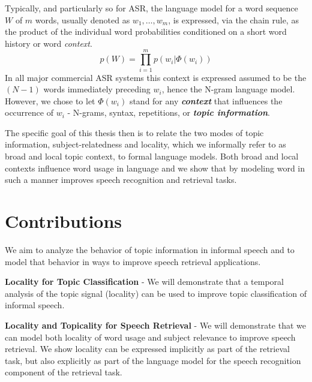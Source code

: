 Typically, and particularly so for ASR, the language model for a word sequence $W$ of $m$ words, usually denoted as $w_1,\ldots,w_m$, is expressed, via the chain rule, as the product of the individual word probabilities conditioned on a short word history or word \textit{context}.
\begin{equation}
p(W) = \prod\limits_{i=1}^m{p(w_i|\Phi(w_i))}
\end{equation}
In all major commercial ASR systems this context is expressed assumed to be the $(N-1)$ words immediately preceding $w_i$, hence the N-gram language model.   However, we chose to let $\Phi(w_i)$ stand for any \textbf{\textit{context}} that influences the occurrence of $w_i$ - N-grams, syntax, repetitions, or \textbf{\textit{topic information}}.

The specific goal of this thesis then is to relate the two modes of topic information, subject-relatedness and locality, which we informally refer to as broad and local topic context, to formal language models.  Both broad and local contexts influence word usage in language and we show that by modeling word in such a manner improves speech recognition and retrieval tasks.  


\section{Contributions}
\label{sec:contributions}
We aim to analyze the behavior of topic information in informal speech and to model that behavior in ways to improve speech retrieval applications.  

\textbf{Locality for Topic Classification} - We will demonstrate that a temporal analysis of the topic signal (locality) can be used to improve topic classification of informal speech.

\textbf{Locality and Topicality for Speech Retrieval} - We will demonstrate that we can model both locality of word usage and subject relevance to improve speech retrieval.  We show locality can be expressed implicitly as part of the retrieval task, but also explicitly as part of the language model for the speech recognition component of the retrieval task.  

